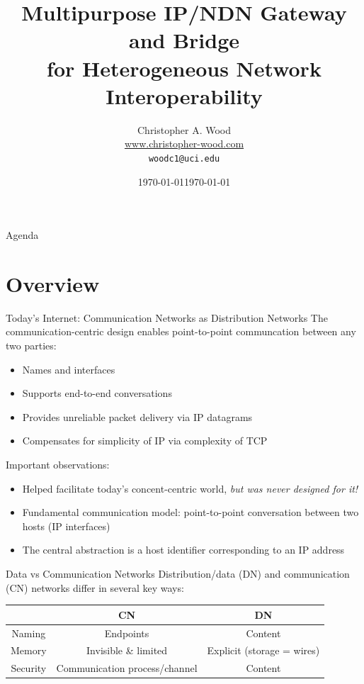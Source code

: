 \documentclass[handout]{beamer}
\title[NDN Gateway]{Multipurpose IP/NDN Gateway and Bridge \\ for Heterogeneous Network Interoperability}
\institute[Donald Bren School of Information and Computer Sciences \\ UC Irvine]{}
\date{\today}
\author[Christopher A. Wood]{Christopher A. Wood \\ \url{www.christopher-wood.com} \\ {\tt woodc1@uci.edu}}
\date{\today}
\begin{document}

\begin{frame}
	\titlepage
\end{frame}

\begin{frame}{Agenda}
	\tableofcontents
\end{frame}


\section{Overview}
\begin{frame}{Today's Internet: Communication Networks as Distribution Networks}
	The communication-centric design enables point-to-point communcation between any two parties:
	\begin{itemize}
		\item Names and interfaces
		\item Supports end-to-end conversations
		\item Provides unreliable packet delivery via IP datagrams
		\item Compensates for simplicity of IP via complexity of TCP
	\end{itemize}

	Important observations:
	\begin{itemize}
		\item Helped facilitate today's concent-centric world, \emph{but was never designed for it!}
		\item Fundamental communication model: point-to-point conversation between two hosts (IP interfaces)
		\item The central abstraction is a host identifier corresponding to an IP address
	\end{itemize}
\end{frame}

\begin{frame}{Data vs Communication Networks}
	Distribution/data (DN) and communication (CN) networks differ in several key ways:
	\begin{table}
		\begin{tabular}{c|c|c} \hline
		~ & CN & DN \\ \hline
		Naming & Endpoints & Content \\
		Memory & Invisible \& limited & Explicit (storage = wires) \\
		Security & Communication process/channel & Content \\ \hline
		\end{tabular}
	\end{table}
\end{frame}
\end{document}
